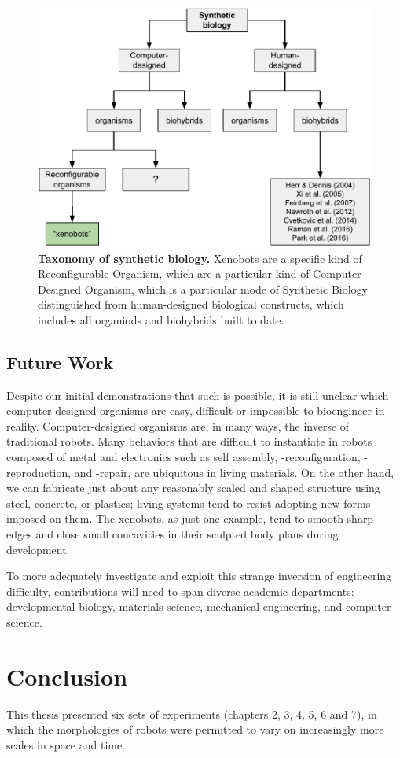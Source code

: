 \begin{figure}
    \centering
    \includegraphics[width=\linewidth]{fig/synthbio.pdf}
    \vspace{1pt}
    \caption{%
    \textbf{Taxonomy of synthetic biology.}
    Xenobots are a specific kind of Reconfigurable Organism, which are a particular kind of Computer-Designed Organism, which is a particular mode of Synthetic Biology distinguished from human-designed biological constructs, which includes all organiods and biohybrids built to date.
    \label{fig:synthbio}%
    }
\end{figure}


\subsection{Future Work}

Despite our initial demonstrations that such is possible, 
it is still unclear which computer-designed organisms are easy, difficult or impossible to bioengineer in reality.
Computer-designed organisms are, in many ways, the inverse of traditional robots.
Many behaviors that are difficult to instantiate in robots composed of metal and electronics such as self assembly, -reconfiguration, -reproduction, and -repair, are ubiquitous in living materials.
On the other hand, we can fabricate just about any reasonably scaled and shaped structure using steel, concrete, or plastics; living systems tend to resist adopting new forms imposed on them.
The xenobots, as just one example, tend to smooth sharp edges and close small concavities in their sculpted body plans during development.

To more adequately investigate and exploit this strange inversion of engineering difficulty, contributions will need to span diverse academic departments: developmental biology, materials science, mechanical engineering, and computer science.



\section{Conclusion}

This thesis presented six sets of experiments (chapters 2, 3, 4, 5, 6 and 7), in which the morphologies of robots were permitted to vary on increasingly more scales in space and time.

